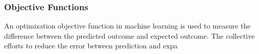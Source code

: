 \subsubsection{Objective Functions}
An optimization objective function in machine learning is used to measure the difference between the predicted outcome and expected outcome. The collective efforts to reduce the error between prediction and expa